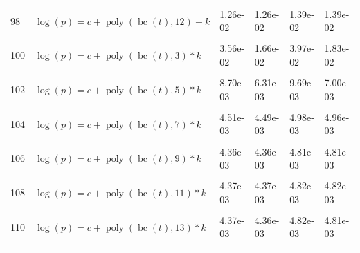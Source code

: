 \documentclass[12pt,a4paper]{article}
\DeclareMathOperator{\bc}{bc}
\DeclareMathOperator{\poly}{poly}
\begin{document}
\begin{longtable}[t]{ll>{\raggedleft\arraybackslash}p{2cm}>{\raggedleft\arraybackslash}p{2cm}>{\raggedleft\arraybackslash}p{2cm}>{\raggedleft\arraybackslash}p{2cm}}
98 & $\log(p) = c + \poly\left( \bc(t), 12 \right) + k$ & 1.26e-02 & 1.26e-02 & 1.39e-02 & 1.39e-02\\
\cellcolor{gray!6}{99} & \cellcolor{gray!6}{$\log(p) = c + \poly\left( \bc(t), 13 \right) + k$} & \cellcolor{gray!6}{1.26e-02} & \cellcolor{gray!6}{1.26e-02} & \cellcolor{gray!6}{1.39e-02} & \cellcolor{gray!6}{1.39e-02}\\
100 & $\log(p) = c + \poly\left( \bc(t), 3 \right) * k$ & 3.56e-02 & 1.66e-02 & 3.97e-02 & 1.83e-02\\
\cellcolor{gray!6}{101} & \cellcolor{gray!6}{$\log(p) = c + \poly\left( \bc(t), 4 \right) * k$} & \cellcolor{gray!6}{1.94e-02} & \cellcolor{gray!6}{1.93e-02} & \cellcolor{gray!6}{2.16e-02} & \cellcolor{gray!6}{2.15e-02}\\
102 & $\log(p) = c + \poly\left( \bc(t), 5 \right) * k$ & 8.70e-03 & 6.31e-03 & 9.69e-03 & 7.00e-03\\
\cellcolor{gray!6}{103} & \cellcolor{gray!6}{$\log(p) = c + \poly\left( \bc(t), 6 \right) * k$} & \cellcolor{gray!6}{4.43e-03} & \cellcolor{gray!6}{4.40e-03} & \cellcolor{gray!6}{4.88e-03} & \cellcolor{gray!6}{4.86e-03}\\
104 & $\log(p) = c + \poly\left( \bc(t), 7 \right) * k$ & 4.51e-03 & 4.49e-03 & 4.98e-03 & 4.96e-03\\
\cellcolor{gray!6}{105} & \cellcolor{gray!6}{$\log(p) = c + \poly\left( \bc(t), 8 \right) * k$} & \cellcolor{gray!6}{4.39e-03} & \cellcolor{gray!6}{4.38e-03} & \cellcolor{gray!6}{4.85e-03} & \cellcolor{gray!6}{4.83e-03}\\
106 & $\log(p) = c + \poly\left( \bc(t), 9 \right) * k$ & 4.36e-03 & 4.36e-03 & 4.81e-03 & 4.81e-03\\
\cellcolor{gray!6}{107} & \cellcolor{gray!6}{$\log(p) = c + \poly\left( \bc(t), 10 \right) * k$} & \cellcolor{gray!6}{4.37e-03} & \cellcolor{gray!6}{4.36e-03} & \cellcolor{gray!6}{4.82e-03} & \cellcolor{gray!6}{4.81e-03}\\
108 & $\log(p) = c + \poly\left( \bc(t), 11 \right) * k$ & 4.37e-03 & 4.37e-03 & 4.82e-03 & 4.82e-03\\
\cellcolor{gray!6}{109} & \cellcolor{gray!6}{$\log(p) = c + \poly\left( \bc(t), 12 \right) * k$} & \cellcolor{gray!6}{4.37e-03} & \cellcolor{gray!6}{4.36e-03} & \cellcolor{gray!6}{4.82e-03} & \cellcolor{gray!6}{4.81e-03}\\
110 & $\log(p) = c + \poly\left( \bc(t), 13 \right) * k$ & 4.37e-03 & 4.36e-03 & 4.82e-03 & 4.81e-03\\
\cellcolor{gray!6}{111} & \cellcolor{gray!6}{$\log(p) = c + \poly\left( \bc(t), 3 \right) + \log(k)$} & \cellcolor{gray!6}{3.64e-02} & \cellcolor{gray!6}{2.04e-02} & \cellcolor{gray!6}{4.05e-02} & \cellcolor{gray!6}{2.26e-02}\\

\end{longtable}
\end{document}
